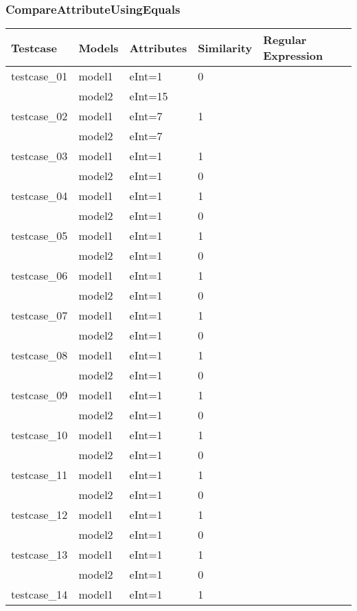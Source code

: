 \documentclass[a4paper]{article}
\begin{document}
\subsubsection{CompareAttributeUsingEquals}

\begin{longtable}{|l|l|l|l|l|}
\hline
Testcase & Models & Attributes & Similarity & Regular Expression\\
\hline
\hline
testcase\_01 & model1 & eInt=1 & 0 & \\
\hline
 						 & model2 & eInt=15 & & \\
\hline
testcase\_02 & model1 & eInt=7 & 1 &\\
\hline
						 & model2 & eInt=7 & & \\
\hline
testcase\_03 & model1 & eInt=1 & 1 &\\
\hline
 & model2 & eInt=1 & 0 &\\
\hline
testcase\_04 & model1 & eInt=1 & 1 &\\
\hline
 & model2 & eInt=1 & 0 &\\
\hline
testcase\_05 & model1 & eInt=1 & 1 &\\
\hline
 & model2 & eInt=1 & 0 &\\
\hline
testcase\_06 & model1 & eInt=1 & 1& \\
\hline
 & model2 & eInt=1 & 0 &\\
\hline
testcase\_07 & model1 & eInt=1 & 1 &\\
\hline
 & model2 & eInt=1 & 0 &\\
\hline
testcase\_08 & model1 & eInt=1 & 1 &\\
\hline
 & model2 & eInt=1 & 0 &\\
\hline
testcase\_09 & model1 & eInt=1 & 1 &\\
\hline
 & model2 & eInt=1 & 0 &\\
\hline
testcase\_10 & model1 & eInt=1 & 1 &\\
\hline
 & model2 & eInt=1 & 0 &\\
\hline
testcase\_11 & model1 & eInt=1 & 1 &\\
\hline
 & model2 & eInt=1 & 0 &\\
\hline
testcase\_12 & model1 & eInt=1 & 1 &\\
\hline
 & model2 & eInt=1 & 0 &\\
\hline
testcase\_13 & model1 & eInt=1 & 1 &\\
\hline
 & model2 & eInt=1 & 0 &\\
\hline
testcase\_14 & model1 & eInt=1 & 1 &\\

\end{longtable}
\end{document}
